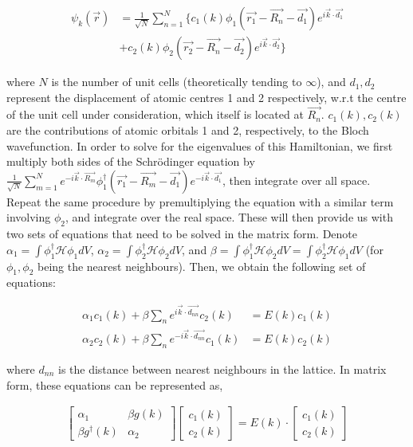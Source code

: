 \documentclass{resonance}
\begin{document}
\begin{align} \nonumber
    \psi_{k}(\vec{r}) &= \frac{1}{\sqrt{N}}\sum_{n=1}^{N}\{c_{1}(k) \phi_{1}(\vec{r_{1}}-\vec{R_{n}}-\vec{d_{1}})e^{i\vec{k}\cdot \vec{d_{1}}} \\
    & + c_{2}(k) \phi_{2}(\vec{r_{2}}-\vec{R_{n}}-\vec{d_{2}})e^{i\vec{k}\cdot \vec{d_{2}}}\}
\end{align}

where $N$ is the number of unit cells (theoretically tending to $\infty$), and $d_{1}, d_{2}$ represent the displacement of atomic centres 1 and 2 respectively, w.r.t the centre of the unit cell under consideration, which itself is located at $\vec{R_{n}}$. $c_{1}(k), c_{2}(k)$ are the contributions of atomic orbitals 1 and 2, respectively, to the Bloch wavefunction. 
In order to solve for the eigenvalues of this Hamiltonian, we first multiply both sides of the Schrödinger equation by $\frac{1}{\sqrt{N}}\sum_{m=1}^{N} e^{-i\vec{k}\cdot \vec{R_{m}}} \phi_{1}^{\dagger}(\vec{r_{1}}-\vec{R_{m}}-\vec{d_{1}})e^{-i\vec{k}\cdot \vec{d_{1}}}$, then integrate over all space. Repeat the same procedure by premultiplying the equation with a similar term involving $\phi_{2}$, and integrate over the real space. These will then provide us with two sets of equations that need to be solved in the matrix form. 
Denote $\alpha_{1} = \int \phi_{1}^{\dagger}\mathcal{H}\phi_{1}dV$, $\alpha_{2} = \int \phi_{2}^{\dagger}\mathcal{H}\phi_{2}dV$, and $\beta = \int \phi_{1}^{\dagger}\mathcal{H}\phi_{2}dV = \int \phi_{2}^{\dagger}\mathcal{H}\phi_{1}dV$ (for $\phi_{1}, \phi_{2}$ being the nearest neighbours). Then, we obtain the following set of equations:

\begin{equation}
    \begin{aligned}
        \alpha_{1} c_{1}(k) + \beta \sum_{n}e^{i\vec{k}\cdot \vec{d_{nn}}} c_{2}(k) &= E(k) c_{1}(k) \\
        \alpha_{2} c_{2}(k) + \beta \sum_{n}e^{-i\vec{k}\cdot \vec{d_{nn}}} c_{1}(k) &= E(k) c_{2}(k)
    \end{aligned}
\end{equation}

where $d_{nn}$ is the distance between nearest neighbours in the lattice. In matrix form, these equations can be represented as,

\begin{gather}
    \begin{bmatrix}
        \alpha_{1} & \beta g(k) \\ \beta g^{\dagger}(k) & \alpha_{2}
    \end{bmatrix}
    \begin{bmatrix}
        c_{1}(k) \\ c_{2}(k)
    \end{bmatrix}
    = E(k) \cdot 
    \begin{bmatrix}
        c_{1}(k) \\ c_{2}(k)
    \end{bmatrix}
\end{gather}
\end{document}
